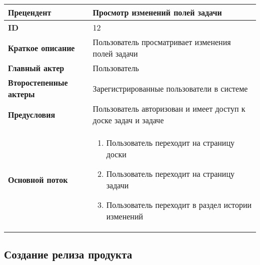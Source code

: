 \documentclass[14pt,a4paper]{extarticle}
\begin{document}
\begin{tabular}{|l|p{9cm}|}
	\hline
	\textbf{Прецендент}            & Просмотр изменений полей задачи                                \\
	\hline
	\textbf{ID}                    & 12                                                             \\
	\hline
	\textbf{Краткое описание}      & Пользователь просматривает изменения полей задачи              \\
	\hline
	\textbf{Главный актер}         & Пользователь                                                   \\
	\hline
	\textbf{Второстепенные актеры} & Зарегистрированные пользователи в системе                      \\
	\hline
	\textbf{Предусловия}           & Пользователь авторизован и имеет доступ к доске задач и задаче \\
	\hline
	\textbf{Основной поток}        & \begin{enumerate}
		                                 \item Пользователь переходит на страницу доски
		                                 \item Пользователь переходит на страницу задачи
		                                 \item Пользователь переходит в раздел истории изменений
	                                 \end{enumerate}         \\
	\hline
\end{tabular}

\subsection{Создание релиза продукта}
\end{document}
